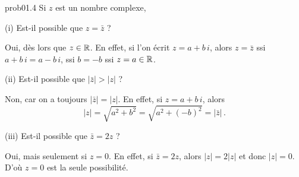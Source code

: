  
\bigskip
\begin{sol}{prob01.4}   Si $z$ est un nombre complexe,
\medskip

(i) Est-il possible que $z={\bar z}$ ? 

\soln Oui, dès lors que $z\in \mathbb{R}$. En effet, si l'on écrit $z=a + b\, i$, alors $z={\bar z}$ ssi $a + b\, i = a - b\, i $, ssi $b=-b$ ssi $z=a\in \mathbb{R}$.

\medskip
(ii) Est-il possible que $|{\bar z}|>|z|$ ? 

\soln Non, car on a toujours $|{\bar z}|=|z|$. En effet,  si $z=a + b\, i$, alors $$|z|=\sqrt{a^2+b^2}=\sqrt{a^2+(-b)^2} =|{\bar z}|\,.$$

\medskip
(iii) Est-il possible que ${\bar z}=2z$ ? 

\soln Oui, mais seulement si $z=0$. En effet, si ${\bar z}=2z$, alors $|z|=2 |z|$ et donc $|z|=0$. D'o\`u $z=0$ est la seule possibilité.

\medskip
\end{sol}